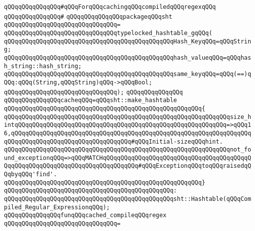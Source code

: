 \newline
\verb|qQQqqQQqqQQqqQQq#qQQqForqQQqcachingqQQqcompiledqQQqregexqQQq|\newline
\verb|qQQqqQQqqQQqqQQq#|\newline
\verb|qQQqqQQqqQQqqQQqpackageqQQqsht|\newline
\verb|qQQqqQQqqQQqqQQqqQQqqQQqqQQqqQQq=|\newline
\verb|qQQqqQQqqQQqqQQqqQQqqQQqqQQqqQQqtypelocked_hashtable_gqQQq(|\newline
\verb|qQQqqQQqqQQqqQQqqQQqqQQqqQQqqQQqqQQqqQQqqQQqqQQqHash_KeyqQQq=qQQqString;|\newline
\verb|qQQqqQQqqQQqqQQqqQQqqQQqqQQqqQQqqQQqqQQqqQQqqQQqhash_valueqQQq=qQQqhash_string::hash_string;|\newline
\verb|qQQqqQQqqQQqqQQqqQQqqQQqqQQqqQQqqQQqqQQqqQQqqQQqsame_keyqQQq=qQQq(==)qQQq:qQQq(String,qQQqString)qQQq->qQQqBool;|\newline
\verb|qQQqqQQqqQQqqQQqqQQqqQQqqQQqqQQq);|\newline
\verb|qQQqqQQqqQQqqQQq|\newline
\verb|qQQqqQQqqQQqqQQqcacheqQQq=qQQqsht::make_hashtable|\newline
\verb|qQQqqQQqqQQqqQQqqQQqqQQqqQQqqQQqqQQqqQQqqQQqqQQqqQQqqQQq{|\newline
\verb|qQQqqQQqqQQqqQQqqQQqqQQqqQQqqQQqqQQqqQQqqQQqqQQqqQQqqQQqqQQqqQQqsize_hintqQQqqQQqqQQqqQQqqQQqqQQqqQQqqQQqqQQqqQQqqQQqqQQqqQQqqQQqqQQq=>qQQq16,qQQqqQQqqQQqqQQqqQQqqQQqqQQqqQQqqQQqqQQqqQQqqQQqqQQqqQQqqQQqqQQqqQQqqQQqqQQqqQQqqQQqqQQqqQQqqQQqqQQqqQQq#qQQqInitial-sizeqQQqhint.|\newline
\verb|qQQqqQQqqQQqqQQqqQQqqQQqqQQqqQQqqQQqqQQqqQQqqQQqqQQqqQQqqQQqqQQqnot_found_exceptionqQQq=>qQQqMATCHqQQqqQQqqQQqqQQqqQQqqQQqqQQqqQQqqQQqqQQqqQQqqQQqqQQqqQQqqQQqqQQqqQQqqQQqqQQqqQQq#qQQqExceptionqQQqtoqQQqraisedqQQqbyqQQq'find'.|\newline
\verb|qQQqqQQqqQQqqQQqqQQqqQQqqQQqqQQqqQQqqQQqqQQqqQQqqQQqqQQq}|\newline
\verb|qQQqqQQqqQQqqQQqqQQqqQQqqQQqqQQqqQQqqQQqqQQqqQQq:|\newline
\verb|qQQqqQQqqQQqqQQqqQQqqQQqqQQqqQQqqQQqqQQqqQQqqQQqsht::Hashtable(qQQqCompiled_Regular_ExpressionqQQq);|\newline
\newline
\newline
\newline
\verb|qQQqqQQqqQQqqQQqfunqQQqcached_compileqQQqregex|\newline
\verb|qQQqqQQqqQQqqQQqqQQqqQQqqQQqqQQq=|\newline
